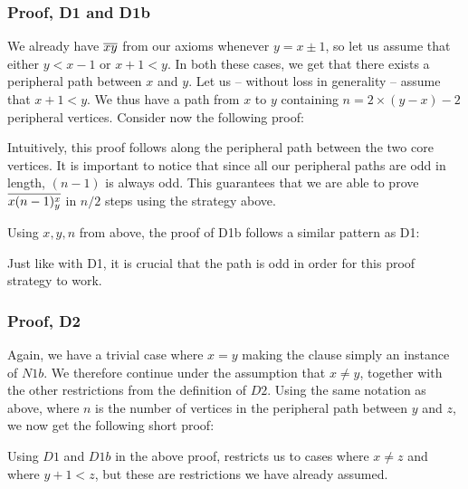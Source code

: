\subsubsection{Proof, D1 and D1b}
\label{subs:Proof, D1 and D1b}
We already have $\overline{xy}$ from our axioms whenever $y = x \pm 1$, so let us assume that either $y < x-1$ or $x + 1 < y$.
In both these cases, we get that there exists a peripheral path between $x$ and $y$.
Let us -- without loss in generality -- assume that $x + 1 < y$.
We thus have a path from $x$ to $y$ containing $n = 2 \times (y - x) - 2$ peripheral vertices.
Consider now the following proof:
\begin{prooftree*}
\end{prooftree*}
Intuitively, this proof follows along the peripheral path between the two core vertices.
It is important to notice that since all our peripheral paths are odd in length, $(n-1)$ is always odd.
This guarantees that we are able to prove $\overline{x(n-1)^x_y}$ in $n/2$ steps using the strategy above.

Using $x,y,n$ from above, the proof of D1b follows a similar pattern as D1:
\begin{prooftree*}
\end{prooftree*}
Just like with D1, it is crucial that the path is odd in order for this proof strategy to work.
\subsubsection{Proof, D2}
\label{subs:Proof, D2}
Again, we have a trivial case where $x = y$ making the clause simply an instance of $N1b$.
We therefore continue under the assumption that $x \neq y$, together with the other restrictions from the definition of $D2$.
Using the same notation as above, where $n$ is the number of vertices in the peripheral path between $y$ and $z$, we now get the following short proof:
\begin{prooftree*}
\end{prooftree*}
Using $D1$ and $D1b$ in the above proof, restricts us to cases where $x \neq z$ and where $y+1 < z$, but these are restrictions we have already assumed.
